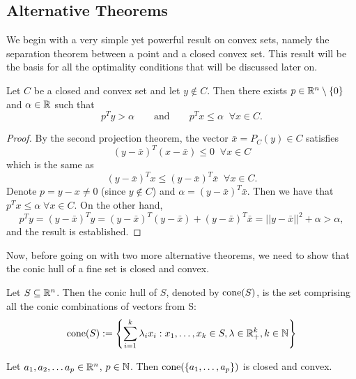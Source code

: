 \documentclass[10pt,a4paper]{article}
\begin{document}
\subsection{Alternative Theorems}
We begin with a very simple yet powerful result on convex sets, namely the separation theorem between a point and a closed convex set. This result will be the basis for all the optimality conditions that will be discussed later on.
\begin{theorem}\label{thm:separation}
	Let $C$ be a closed and convex set and let $y\not \in C$. Then there exists $p\in \mathbb{R}^n \setminus \{0\}$ and $\alpha\in \mathbb{R}$ such that
	\begin{equation*}
		p^Ty>\alpha \qquad \text{and} \qquad p^Tx\leq \alpha \;\;\forall x\in C.
	\end{equation*}
\end{theorem}
\begin{proof}
By the second projection theorem, the vector $\bar{x}=P_C(y)\in C$ satisfies
\begin{equation*}
	(y-\bar{x})^T(x-\bar{x}) \leq 0 \;\; \forall x\in C
\end{equation*}
which is the same as 
\begin{equation*}
	(y-\bar{x})^T x \leq (y-\bar{x})^T \bar{x} \;\; \forall x\in C.
\end{equation*}
Denote $p=y-x\neq 0$ (since $y\not \in C$) and $\alpha= (y-\bar{x})^T \bar{x}$. Then we have that $p^Tx\leq \alpha\;\forall x\in C$. On the other hand,
\begin{equation*}
	p^Ty = (y-\bar{x})^Ty = (y-\bar{x})^T(y-\bar{x}) + (y-\bar{x})^T\bar{x} = ||y-\bar{x}||^2 + \alpha > \alpha,
\end{equation*}
and the result is established.
\end{proof}
\noindent Now, before going on with two more alternative theorems, we need to show that the conic hull of a fine set is closed and convex.
\begin{definition} Let $S\subseteq \mathbb{R}^n$. Then the conic hull of $S$, denoted by $\mathord{\mathrm{cone}}(S)$,
	is the set comprising all the conic combinations of vectors from S:
	\begin{equation*}
		\mathord{\mathrm{cone}}(S):=\left\{\sum_{i=1}^k \lambda_i x_i: x_1,\dots, x_k\in S, \lambda\in \mathbb{R}^k_+, k \in \mathbb{N}\right\}
	\end{equation*}
\end{definition}
\begin{lemma}\label{lemma:cone}
	Let $a_1, a_2, \dots a_p\in \mathbb{R}^n$, $p\in \mathbb{N}$. Then $\mathord{\mathrm{cone}}(\{a_1, \dots, a_p\})$ is closed and convex.
\end{lemma}
\end{document}
